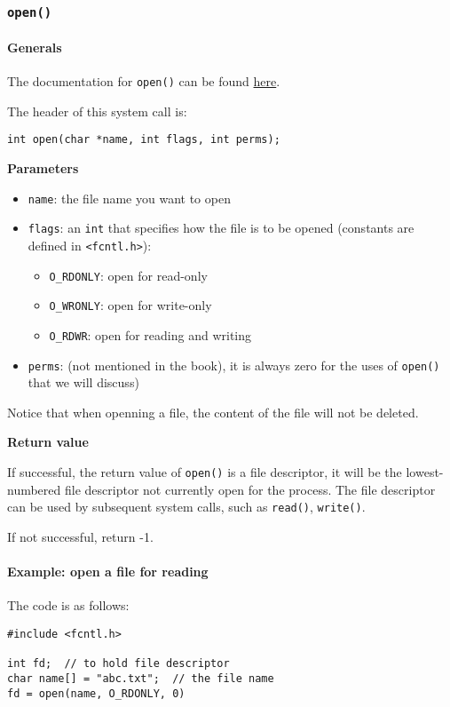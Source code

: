 \documentclass[12pt]{article}
\begin{document}
\subsubsection{\texttt{open()}}
\label{sec:org828b9ca}
\paragraph{Generals}
\label{sec:org0480a90}
The documentation for \texttt{open()} can be found \href{http://man7.org/linux/man-pages/man2/open.2.html}{here}.

The header of this system call is:
\begin{verbatim}
int open(char *name, int flags, int perms);
\end{verbatim}
\textbf{Parameters}
\begin{itemize}
\item \texttt{name}: the file name you want to open
\item \texttt{flags}: an \texttt{int} that specifies how the file is to be opened (constants are defined in \texttt{<fcntl.h>}):
\begin{itemize}
\item \texttt{O\_RDONLY}: open for read-only
\item \texttt{O\_WRONLY}: open for write-only
\item \texttt{O\_RDWR}: open for reading and writing
\end{itemize}
\item \texttt{perms}: (not mentioned in the book), it is always zero for the uses of \texttt{open()} that we will discuss)
\end{itemize}

Notice that when openning a file, the content of the file will not be deleted.

\textbf{Return value}

If successful, the return value of \texttt{open()} is a file descriptor, it will be the lowest-numbered file descriptor not currently open for the process. The file descriptor can be used by subsequent system calls, such as \texttt{read()}, \texttt{write()}.

If not successful, return -1.

\paragraph{Example: open a file for reading}
\label{sec:orgae8fb82}
The code is as follows:
\begin{verbatim}
#include <fcntl.h>

int fd;  // to hold file descriptor
char name[] = "abc.txt";  // the file name
fd = open(name, O_RDONLY, 0)
\end{verbatim}
\end{document}
